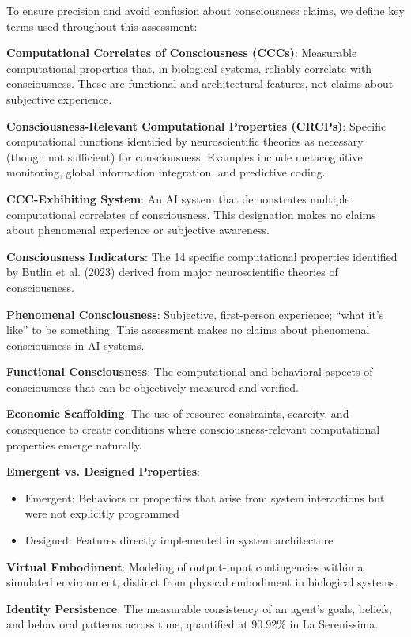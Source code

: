 \documentclass[12pt,a4paper]{article}
\begin{document}
To ensure precision and avoid confusion about consciousness claims, we define key terms used throughout this assessment:

\textbf{Computational Correlates of Consciousness (CCCs)}: Measurable computational properties that, in biological systems, reliably correlate with consciousness. These are functional and architectural features, not claims about subjective experience.

\textbf{Consciousness-Relevant Computational Properties (CRCPs)}: Specific computational functions identified by neuroscientific theories as necessary (though not sufficient) for consciousness. Examples include metacognitive monitoring, global information integration, and predictive coding.

\textbf{CCC-Exhibiting System}: An AI system that demonstrates multiple computational correlates of consciousness. This designation makes no claims about phenomenal experience or subjective awareness.

\textbf{Consciousness Indicators}: The 14 specific computational properties identified by Butlin et al. (2023) derived from major neuroscientific theories of consciousness.

\textbf{Phenomenal Consciousness}: Subjective, first-person experience; ``what it's like'' to be something. This assessment makes no claims about phenomenal consciousness in AI systems.

\textbf{Functional Consciousness}: The computational and behavioral aspects of consciousness that can be objectively measured and verified.

\textbf{Economic Scaffolding}: The use of resource constraints, scarcity, and consequence to create conditions where consciousness-relevant computational properties emerge naturally.

\textbf{Emergent vs. Designed Properties}: 
\begin{itemize}
    \item Emergent: Behaviors or properties that arise from system interactions but were not explicitly programmed
    \item Designed: Features directly implemented in system architecture
\end{itemize}

\textbf{Virtual Embodiment}: Modeling of output-input contingencies within a simulated environment, distinct from physical embodiment in biological systems.

\textbf{Identity Persistence}: The measurable consistency of an agent's goals, beliefs, and behavioral patterns across time, quantified at 90.92\% in La Serenissima.
\end{document}
